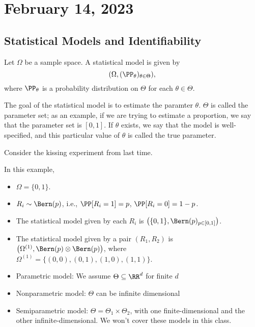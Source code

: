 \section{February 14, 2023}

\subsection{Statistical Models and Identifiability}

\begin{definition}

Let $\Omega$ be a sample space. A \ac{statistical model} is given by 
\[(\Omega, (\PP_{\theta})_{\theta\in \Theta}),\]
where $\PP_{\theta}$ is a probability distribution on $\Theta$ for each $\theta\in \Theta$.
\end{definition}

The goal of the statistical model is to estimate the paramter $\theta$. $\Theta$ is called the parameter set; as an example, if we are trying to estimate a proportion, we say that the parameter set is $[0,1]$. If $\theta$ exists, we say that the model is \ac{well-specified}, and this particular value of $\theta$ is called the \ac{true parameter}.

\begin{example}
\exlabel

Consider the kissing experiment from last time.
\end{example}
In this example,
\begin{itemize}
    \item $\Omega = \{0,1\}$. 
    \item $R_i\sim \Bern(p)$, i.e., $\PP[R_i = 1] = p$, $\PP[R_i = 0] = 1-p$.
    \item The statistical model given by each $R_i$ is $\left(\{0,1\}, \Bern(p)_{p\in [0,1]}\right)$.
    \item The statistical model given by a pair $(R_1, R_2)$ is $\left(\Omega^{(1)}, \Bern(p)\otimes \Bern(p)\right)$, where $\Omega^{(1)}=\{(0,0), (0,1), (1,0), (1,1)\}$.
\end{itemize}

\begin{definition}
\begin{itemize}
    \item \ac{Parametric} model: We assume $\Theta\subseteq \RR^d$ for finite $d$
    \item \ac{Nonparametric} model: $\Theta$ can be infinite dimensional
    \item \ac{Semiparametric} model: $\Theta = \Theta_1\times \Theta_2$, with one finite-dimensional and the other infinite-dimensional. We won't cover these models in this class. 
\end{itemize}
\end{definition}

